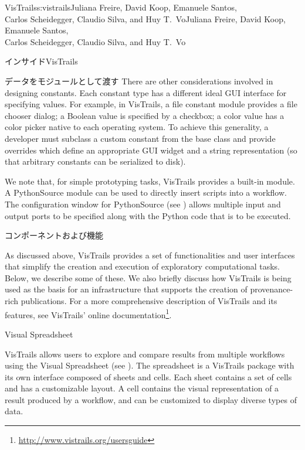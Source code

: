 \begin{aosachaptertoc}{VisTrails}{s:vistrails}{Juliana Freire, David Koop, Emanuele Santos, \\ Carlos Scheidegger, Claudio Silva, and Huy T.\ Vo}{Juliana Freire, David Koop, Emanuele Santos, \\ \hspace*{0.9cm} Carlos Scheidegger, Claudio Silva, and Huy T.\ Vo}
\begin{aosasect1}{インサイドVisTrails}
\begin{aosasect2}{データをモジュールとして渡す}
There are other considerations involved in designing constants. 
Each constant type has a different ideal GUI interface for
specifying values. For example, in VisTrails, a file constant module
provides a file chooser dialog; a Boolean value is specified by a
checkbox; a color value has a color picker native to each operating
system.  To achieve this generality, a developer must subclass a
custom constant from the  base class and provide
overrides which define an appropriate GUI widget and a string
representation (so that arbitrary constants can be serialized to
disk).

We note that, for simple prototyping tasks, VisTrails provides a
built-in  module.  A PythonSource module can be
used to directly insert scripts into a workflow. The configuration
window for PythonSource (see )
allows multiple input and output ports to be specified along with the
Python code that is to be executed.

\end{aosasect2}

\end{aosasect1}

\begin{aosasect1}{コンポーネントおよび機能}

As discussed above, VisTrails provides a set of functionalities and
user interfaces that simplify the creation and execution of
exploratory computational tasks. Below, we describe some of these. We
also briefly discuss how VisTrails is being used as the basis for an
infrastructure that supports the creation of provenance-rich
publications. For a more comprehensive description of VisTrails and its features,
see VisTrails' online documentation\footnote{\url{http://www.vistrails.org/usersguide}}.


\begin{aosasect2}{Visual Spreadsheet}

VisTrails allows users to explore and compare results from multiple
workflows using the Visual Spreadsheet (see
). The spreadsheet is a
VisTrails package with its own interface composed of sheets and
cells. Each sheet contains a set of cells and has a customizable
layout.  A cell contains the visual representation of a result
produced by a workflow, and can be customized to display diverse types
of data.


\end{aosasect2}
\end{aosasect1}
\end{aosachaptertoc}
